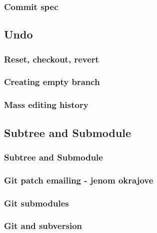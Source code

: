 \documentclass[pdftex]{beamer}
\begin{document}
\begin{frame}
	\frametitle{Commit spec}
\end{frame}

\subsection{Undo}

\begin{frame}
	\frametitle{Reset, checkout, revert}
\end{frame}


\begin{frame}
	\frametitle{Creating empty branch}
\end{frame}

\begin{frame}
	\frametitle{Mass editing history}
\end{frame}

\subsection{Subtree and Submodule}

\begin{frame}
	\frametitle{Subtree and Submodule}
\end{frame}

\begin{frame}
	\frametitle{Git patch emailing - jenom okrajove}
\end{frame}

\begin{frame}
	\frametitle{Git submodules}
\end{frame}

\begin{frame}
	\frametitle{Git and subversion}
\end{frame}
\end{document}
